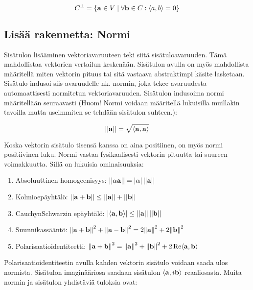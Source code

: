 \documentclass[../johdoksia.tex]{subfiles}
\begin{document}
	\begin{equation}
		C^\perp = \left\{\mathbf{a} \in V \mid \forall \mathbf{b} \in C: \langle a,b\rangle = 0\right\}
	\end{equation}

	\subsection{Lisää rakennetta: Normi}
	
	Sisätulon lisääminen vektoriavaruuteen teki siitä sisätuloavaruuden. Tämä mahdollistaa vektorien vertailun keskenään. Sisätulon avulla on myös mahdollista määritellä miten vektorin pituus tai sitä vastaava abstraktimpi käsite lasketaan. Sisätulo indusoi siis avaruudelle nk. normin, joka tekee avaruudesta automaattisesti normitetun vektoriavaruuden. Sisätulon indusoima normi määritellään seuraavasti (Huom! Normi voidaan määritellä lukuisilla muillakin tavoilla mutta useimmiten se tehdään sisätulon suhteen.):
	
	\begin{equation}
		||\mathbf{a}|| = \sqrt{\langle\mathbf{a},\mathbf{a}\rangle}
	\end{equation}

	Koska vektorin sisätulo tisensä kanssa on aina positiinen, on myös normi positiivinen luku. Normi vastaa fysikaalisesti vektorin pituutta tai suureen voimakkuutta. Sillä on lukuisia ominaisuuksia:
	
	\begin{enumerate}
		\item Absoluuttinen homogeenisyys: $||\alpha\mathbf{a}|| = |\alpha|\,||\mathbf{a}||$
		\item Kolmioepäyhtälö: $||\mathbf{a} + \mathbf{b}|| \leq ||\mathbf{a}|| + ||\mathbf{b}||$
		\item Cauchyn\textendash Schwarzin epäyhtälö: $|\langle\mathbf{a},\mathbf{b}\rangle| \leq ||\mathbf{a}||\,||\mathbf{b}||$
		\item Suunnikassääntö: $\norm{\mathbf{a} + \mathbf{b}}^2 + \norm{\mathbf{a} - \mathbf{b}}^2 = 2\norm{\mathbf{a}}^2 + 2\norm{\mathbf{b}}^2$
		\item Polarisaatioidentiteetti: $\norm{\mathbf{a} + \mathbf{b}}^2 = \norm{\mathbf{a}}^2 + \norm{\mathbf{b}}^2 + 2\Re\langle\mathbf{a},\mathbf{b}\rangle$
	\end{enumerate}

	Polarisaatioidentiteetin avulla kahden vektorin sisätulo voidaan saada ulos normista. Sisätulon imaginääriosa saadaan sisätulon $\langle\mathbf{a},i\mathbf{b}\rangle$ reaaliosasta. Muita normin ja sisätulon yhdistäviä tuloksia ovat:
	
\end{document}
